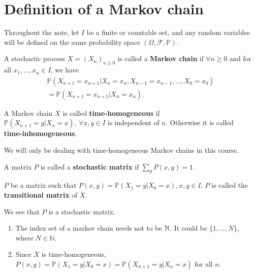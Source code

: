 \documentclass[a4paper]{article}
\begin{document}
\maketitle
\clearpage
\tableofcontents
\clearpage 

\section{Definition of a Markov chain}
Throughout the note, let $ I $ be a finite or countable set, and any random variables will be defined on the same probability space $ (\Omega, \mathcal{F}, \mathbb{P}) $.

\begin{definition}
    A stochastic process $ X=(X_n)_{n\ge 0} $ is called a \textbf{Markov chain} if $ \forall n\ge 0 $ and for all $ x_1,\dots,x_n\in I $, we have 
    \[
        \begin{aligned}
            &\mathbb{P}(X_{n+1}=x_{n+1}|X_n=x_n, X_{n-1}=x_{n-1}, \dots, X_0=x_0)\\ &= \mathbb{P}(X_{n+1}=x_{n+1}|X_n=x_n).
        \end{aligned}
    \]
\end{definition}
\begin{definition}
    A Markov chain $X$ is called \textbf{time-homogeneous} if $ \mathbb{P}(X_{n+1}=y|X_n=x),\ \forall x,y\in I $ is independent of $n$. Otherwise it is called \textbf{time-inhomogeneous}.
\end{definition}
We will only be dealing with time-homogeneous Markov chains in this course.
\begin{definition}
    A matrix $P$ is called a \textbf{stochastic matrix} if $ \sum_{y}P(x,y)=1 $.
\end{definition}

\begin{definition}
    $P$ be a matrix such that $ P(x,y) = \mathbb{P}(X_1=y|X_0=x), x,y\in I $. $P$ is called the \textbf{transitional matrix} of $X$.
\end{definition}

We see that $P$ is a stochastic matrix.

\begin{remark}
    \begin{enumerate}
        \item The index set of a markov chain needs not to be ${\mathbb{N}}$. It could be $ \{1,\dots,N\} $, where $ N\in \mathbb{N} $.
        \item Since $X$ is time-homogeneous, $ P(x,y)=\mathbb{P}(X_1=y|X_0=x)=\mathbb{P}(X_{n+1}=y|X_n=x) $ for all $n$.
    \end{enumerate}
\end{remark}
\end{document}
